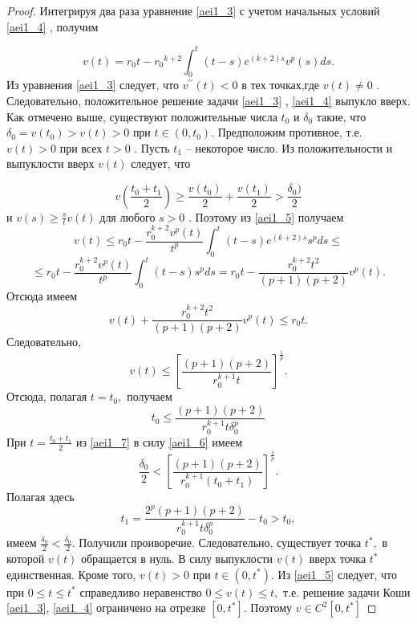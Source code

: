 \begin{proof}
 
Интегрируя два раза уравнение \eqref{aei1_3} 
 с учетом начальных условий \eqref{aei1_4} , получим

\begin{equation}\label{aei1_5}
v(t)=r_0t-{r_0}^{k+2} \int_0^t(t-s)e^{(k+2)s}v^p(s)ds.
\end{equation}
Из уравнения \eqref{aei1_3}  следует, что $ v^{\prime\prime}(t)<0 $ в тех
точках,где $ v(t) \neq 0 $ . 
Следовательно, положительное решение
задачи \eqref{aei1_3} , \eqref{aei1_4}  выпукло вверх. Как отмечено выше, существуют
положительные числа $ t_0 $ и $ \delta_0 $ такие, что $
\delta_0=v(t_0)>v(t)>0 $  при $ t \in (0,t_0)$. Предположим
противное, т.е. $ v(t)>0 $  при всех $ t>0 $ . Пусть $ t_1$ --
некоторое число. Из положительности и выпуклости вверх $ v(t) $
следует, что

\begin{equation}\label{aei1_6}
 v(\frac{t_0+t_1}{2})
\geq \frac{v(t_0)}{2}+\frac{v(t_1)}{2}>\frac{\delta_0)}{2} 
\end{equation}
и $ v(s) \geq \frac {s}{t}v(t) $ для любого $ s>0 $ .
Поэтому из \eqref{aei1_5} получаем
$$
v(t) \leq r_0t-\frac{r_0^{k+2}v^p(t)}{t^p}
\int_0^t(t-s)e^{(k+2)s}s^pds \leq
$$
$$
 \leq r_0t-\frac{r_0^{k+2}v^p(t)}{t^p}
 \int_0^t(t-s)s^pds=
  r_0t-\frac{r_0^{k+2}t^2}{(p+1)(p+2)}v^p(t).
$$
Отсюда имеем
$$
v(t)+\frac{r_0^{k+2}t^2}{(p+1)(p+2)}v^p(t) \leq r_0t.
$$
Следовательно,
\begin{equation}\label{aei1_7}
v(t)
\leq {\left [\frac {(p+1)(p+2)}{r_0^{k+1}t}\right ]}^
{\frac{1}{p}}.   
\end{equation}
Отсюда, полагая $ t=t_0,  $ получаем
$$
t_0 \leq \frac {(p+1)(p+2)}{r_0^{k+1}t\delta_0^p}
$$
При $ t=\frac{t_0+t_1}{2} $ из \eqref{aei1_7} в силу \eqref{aei1_6} имеем
$$
\frac {\delta_0}{2}<
{\left [\frac {(p+1)(p+2)}{r_0^{k+1}(t_0+t_1)}\right ]}^
{\frac{1}{p}}.
$$
Полагая здесь
$$
t_1=\frac {2^p(p+1)(p+2)}{r_0^{k+1}t\delta_0^p}-t_0>t_0,
$$
имеем $ \frac{\delta_0}{2}<\frac{\delta_0}{2}$. 
Получили проиворечие. Следовательно, существует точка $ t^*, $
в которой $ v(t) $ обращается в нуль. В силу выпуклости
$ v(t) $  вверх точка $ t^* $  единственная. Кроме того,
$ v(t)>0 $   при $ t \in (0,t^*) $. Из \eqref{aei1_5} следует, что
 при $ 0 \leq t \leq t^* $  справедливо неравенство
$ 0 \leq v(t) \leq t, $ т.е. решение задачи Коши \eqref{aei1_3}, \eqref{aei1_4}
ограничено на отрезке $ [0,t^*] $. Поэтому $ v \in C^2[0,t^*]$
\end{proof}

